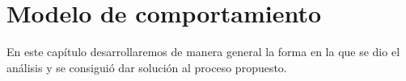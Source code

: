 
\pagebreak
\chapter{Modelo de comportamiento}

	En este capítulo desarrollaremos de manera general la forma en la que se dio el análisis y se consiguió dar solución al proceso propuesto.


	
	
	


